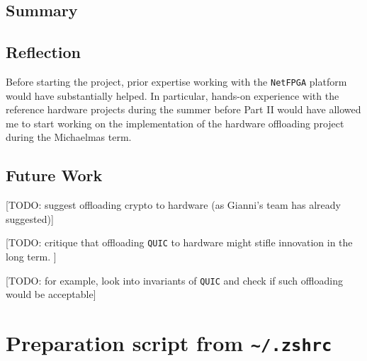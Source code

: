 \documentclass[12pt,a4paper,twoside,openright]{report}
\begin{document}
\section{Summary}

\section{Reflection}
Before starting the project, prior expertise working with the \texttt{NetFPGA} platform would have substantially helped.
In particular, hands-on experience with the reference hardware projects during the summer before Part II would have allowed me to start working on the implementation of the hardware offloading project during the Michaelmas term.


\section{Future Work}
[TODO: suggest offloading crypto to hardware (as Gianni's team has already suggested)]

[TODO: critique that offloading \texttt{QUIC} to hardware might stifle innovation in the long term. ]

[TODO: for example, look into invariants of \texttt{QUIC} and check if such offloading would be acceptable]



\appendix

\chapter{Preparation script from \texttt{\textasciitilde/.zshrc}} \label{preparation_script_from_zshrc}
\end{document}
